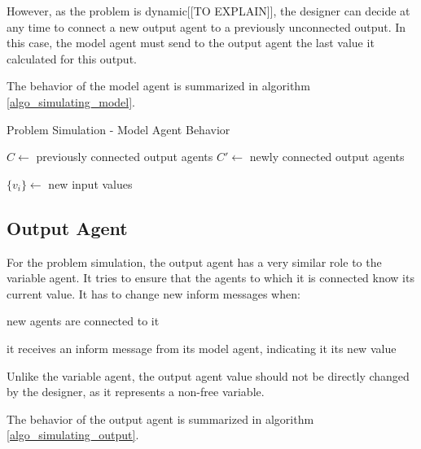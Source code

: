 However, as the problem is dynamic[[TO EXPLAIN]], the designer can decide at any time to connect a new output agent to a previously unconnected output. In this case, the model agent must send to the output agent the last value it calculated for this output.

The behavior of the model agent is summarized in algorithm \ref{algo_simulating_model}.

\begin{algorithm}
\caption{Problem Simulation - Model Agent Behavior}
\label{algo_simulating_model}

	$C \leftarrow$ previously connected output agents\;
	$C'\leftarrow$  newly connected output agents\;
	
	$\{v_i\} \leftarrow$ new input values\;
			
	
	
\end{algorithm}

\subsection{Output Agent}

For the problem simulation, the output agent has a very similar role to the variable agent. It tries to ensure that the agents to which it is connected know its current value. It has to change new inform messages when:
\begin{compactitem}
\item new agents are connected to it
\item it receives an inform message from its model agent, indicating it its new value
\end{compactitem}

Unlike the variable agent, the output agent value should not be directly changed by the designer, as it represents a non-free variable.

The behavior of the output agent is summarized in algorithm \ref{algo_simulating_output}.

